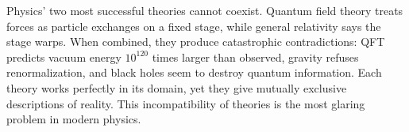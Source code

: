 Physics' two most successful theories cannot coexist. Quantum field theory treats forces as particle exchanges on a fixed stage, while general relativity says the stage warps. When combined, they produce catastrophic contradictions: QFT predicts vacuum energy $10^{120}$ times larger than observed, gravity refuses renormalization, and black holes seem to destroy quantum information. Each theory works perfectly in its domain, yet they give mutually exclusive descriptions of reality. This incompatibility of theories is the most glaring problem in modern physics.
